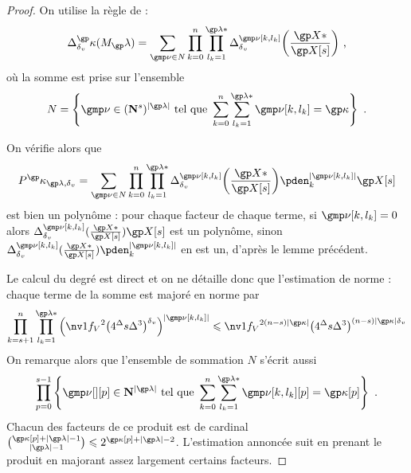 \begin{proof}
  \newcommand \indl {{ \gmp\nu[\ind, \indi_\ind] }}
  On utilise la règle de  :
  \begin{equation}
    \pdiff^\derp(M_\ip) =
    \sum_{\gmp\nu \in N}
    \prod\indrange
    \prod_{ \indi_\ind = 1 }^{ \ip* }
    \pdiff^\indl \biggl( \frac{ \vp* }{ \vp[\anydim] } \biggr)
    \pmm,
  \end{equation}
  où la somme est prise sur l'ensemble
  \begin{equation}
    N = \left\{
      \gmp\nu \in (\N^\anydim)^{\lgr\ip}
      \text{ tel que }
      \sum\indrange \sum_{\indi_\ind = 1}^{\ip*} \indl = \derp
    \right\}
    \pmm.
  \end{equation}

  On vérifie alors que
  \begin{equation}
    P^\derp_{\ip, \dv}
    =
    \sum_{\gmp\nu \in N}
    \prod\indrange
    \prod_{ \indi_\ind = 1 }^{ \ip* }
    \pdiff^\indl \biggl( \frac{ \vp* }{ \vp[\anydim] } \biggr)
    \pden_\ind^{\lgr\indl}
    \vp[\anydim]
  \end{equation}
  est bien un polynôme : pour chaque facteur de chaque terme, si \( \indl = 0
  \) alors \(
    \pdiff^\indl ( \frac{ \vp* }{ \vp[\anydim] } )
    \vp[\anydim]
  \) est un polynôme, sinon \(
    \pdiff^\indl ( \frac{ \vp* }{ \vp[\anydim] } )
    \pden_\ind^{\lgr\indl}
  \) en est un, d'après le lemme précédent.

  Le calcul du degré est direct et on ne détaille donc que l'estimation de
  norme : chaque terme de la somme est majoré en norme par
  \begin{align}
    \prod_{\ind = \anydim + 1}^{\dimp}
    \prod_{ \indi_\ind = 1 }^{ \ip* }
    \left(
      \nv1{ \chow\anyvar }^2
      \bigl( 4^\anydeg \anydim \anydeg^{3} \bigr)^\dv
    \right)^{\lgr\indl}
    \le
    \nv1{ \chow\anyvar }^{2 (\dimp - \anydim) \lgr\derp}
    \bigl( 4^\anydeg \anydim \anydeg^{3} \bigr)
    ^{(\dimp - \anydim) \lgr\derp \dv}
  \end{align}
  On remarque alors que l'ensemble de sommation \( N \) s'écrit aussi
  \begin{equation}
    \prod_{p = 0}^{\anydim - 1} \left\{
      \gmp\nu[][p] \in \N^{\lgr\ip}
      \text{ tel que }
      \sum\indrange \sum_{\indi_\ind = 1}^{\ip*}
      \gmp\nu[\ind, \indi_\ind][p]
      = \derp[p]
    \right\}
    \pmm.
  \end{equation}
  Chacun des facteurs de ce produit est de cardinal
  \(
    \binom{ \derp[p] + \lgr\ip - 1 }{ \lgr\ip - 1 }
    \le
    2^{ \derp[p] + \lgr\ip - 2 }
  \).
  L'estimation annoncée suit en prenant le produit en majorant assez largement
  certains facteurs.


\end{proof}

